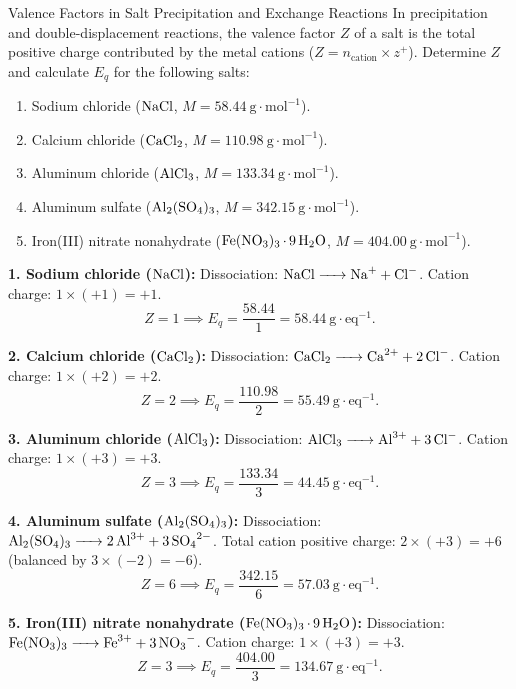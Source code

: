 \begin{exercise}{Valence Factors in Salt Precipitation and Exchange Reactions}
In precipitation and double-displacement reactions, the valence factor $Z$ of a salt is the total positive charge contributed by the metal cations ($Z = n_{\text{cation}} \times z^+$). Determine $Z$ and calculate $E_q$ for the following salts:
\begin{enumerate}[leftmargin=1.5em,itemsep=2pt]
  \item Sodium chloride ($\ce{NaCl}$, $M = 58.44\ \mathrm{g\cdot mol^{-1}}$).
  \item Calcium chloride ($\ce{CaCl2}$, $M = 110.98\ \mathrm{g\cdot mol^{-1}}$).
  \item Aluminum chloride ($\ce{AlCl3}$, $M = 133.34\ \mathrm{g\cdot mol^{-1}}$).
  \item Aluminum sulfate ($\ce{Al2(SO4)3}$, $M = 342.15\ \mathrm{g\cdot mol^{-1}}$).
  \item Iron(III) nitrate nonahydrate ($\ce{Fe(NO3)3*9H2O}$, $M = 404.00\ \mathrm{g\cdot mol^{-1}}$).
\end{enumerate}
\end{exercise}

\begin{tabletworkspace}[5.0cm]
\end{tabletworkspace}

\begin{solution}
\textbf{1. Sodium chloride ($\ce{NaCl}$):}
Dissociation: $\ce{NaCl -> Na+ + Cl-}$. Cation charge: $1 \times (+1) = +1$.
\[
Z = 1 \implies E_q = \frac{58.44}{1} = \mathbf{58.44\ \mathrm{g\cdot eq^{-1}}}.
\]

\textbf{2. Calcium chloride ($\ce{CaCl2}$):}
Dissociation: $\ce{CaCl2 -> Ca^{2+} + 2 Cl-}$. Cation charge: $1 \times (+2) = +2$.
\[
Z = 2 \implies E_q = \frac{110.98}{2} = \mathbf{55.49\ \mathrm{g\cdot eq^{-1}}}.
\]

\textbf{3. Aluminum chloride ($\ce{AlCl3}$):}
Dissociation: $\ce{AlCl3 -> Al^{3+} + 3 Cl-}$. Cation charge: $1 \times (+3) = +3$.
\[
Z = 3 \implies E_q = \frac{133.34}{3} = \mathbf{44.45\ \mathrm{g\cdot eq^{-1}}}.
\]

\textbf{4. Aluminum sulfate ($\ce{Al2(SO4)3}$):}
Dissociation: $\ce{Al2(SO4)3 -> 2 Al^{3+} + 3 SO4^{2-}}$.
Total cation positive charge: $2 \times (+3) = +6$ (balanced by $3 \times (-2) = -6$).
\[
Z = 6 \implies E_q = \frac{342.15}{6} = \mathbf{57.03\ \mathrm{g\cdot eq^{-1}}}.
\]

\textbf{5. Iron(III) nitrate nonahydrate ($\ce{Fe(NO3)3*9H2O}$):}
Dissociation: $\ce{Fe(NO3)3 -> Fe^{3+} + 3 NO3-}$. Cation charge: $1 \times (+3) = +3$.
\[
Z = 3 \implies E_q = \frac{404.00}{3} = \mathbf{134.67\ \mathrm{g\cdot eq^{-1}}}.
\]
\end{solution}

